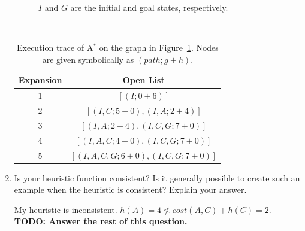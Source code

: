 \documentclass[12pt]{article}
\newenvironment{problem}[2][Problem]{\begin{trivlist}
\item[\hskip \labelsep {\bfseries #1}\hskip \labelsep {\bfseries #2.}]}{\end{trivlist}}
\begin{document}
\begin{problem}{3}
\begin{enumerate}
\begin{figure}[h]
				\caption{$I$ and $G$ are the initial and goal states, respectively.}
				\label{fig:p3graph}
			\end{figure} \\
			\begin{table}[h]
				\centering
				\begin{tabular}{c|c}
					Expansion & Open List \\ %
					\hline
					1 & $[(I; 0+6)]$ \\
					2 & $[(I,C; 5+0), (I,A; 2+4)]$ \\
					3 & $[(I,A; 2+4), (I,C,G; 7+0)]$  \\
					4 & $[(I,A,C; 4+0), (I,C,G; 7+0)]$  \\
					5 & $[(I,A,C,G; 6+0), (I,C,G; 7+0)]$ \\
				\end{tabular}
				\caption{Execution trace of A$^*$ on the graph in Figure~\ref{fig:p3graph}. Nodes are given symbolically as $(path; g+h)$.}%
				\label{tbl:trace}
			\end{table}
		\item Is your heuristic function consistent? Is it generally possible to create such an example when the heuristic is consistent? Explain your answer.

			\vspace{0.25cm}
			My heuristic is inconsistent. $h(A) = 4 \nleq cost(A,C) + h(C) = 2$.
			\textbf{TODO: Answer the rest of this question.}
\end{enumerate}
\end{problem}
\end{document}
